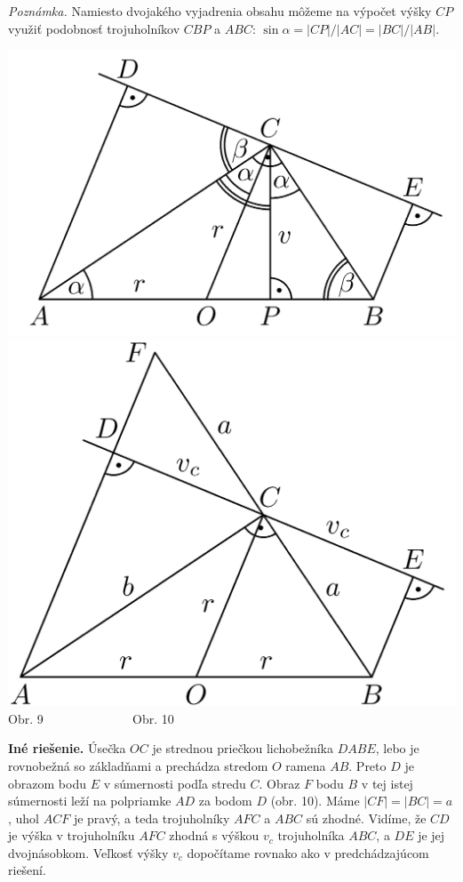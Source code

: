 \documentclass[11pt,a4paper,oneside,final]{book}
\begin{document}
\textit{Poznámka.} Namiesto dvojakého vyjadrenia obsahu môžeme na výpočet výšky $CP$ využiť podobnosť trojuholníkov $CBP$ a $ABC$: $\sin \alpha = |CP|/|AC| = |BC|/|AB|$.
\begin{center}
\includegraphics{58D21} \includegraphics{58D22}\\

Obr. 9 \ \ \  \ \ \ \ \ \ \hspace{80pt} \ \ \ \ Obr. 10
\end{center}
\textbf{Iné riešenie.} Úsečka $OC$ je strednou priečkou lichobežníka $DABE$, lebo je rovnobežná so základňami a prechádza stredom $O$ ramena $AB$. Preto $D$ je obrazom bodu $E$ v súmernosti podľa stredu $C$. Obraz $F$ bodu $B$ v tej istej súmernosti leží na polpriamke $AD$ za bodom $D$ (obr. 10). Máme $|CF| = |BC| = a$, uhol $ACF$ je pravý, a teda trojuholníky $AFC$ a $ABC$ sú zhodné. Vidíme, že $CD$ je výška v trojuholníku $AFC$ zhodná s výškou $v_c$ trojuholníka $ABC$, a $DE$ je jej dvojnásobkom. Veľkosť výšky $v_c$ dopočítame rovnako ako v predchádzajúcom riešení.
\end{document}

